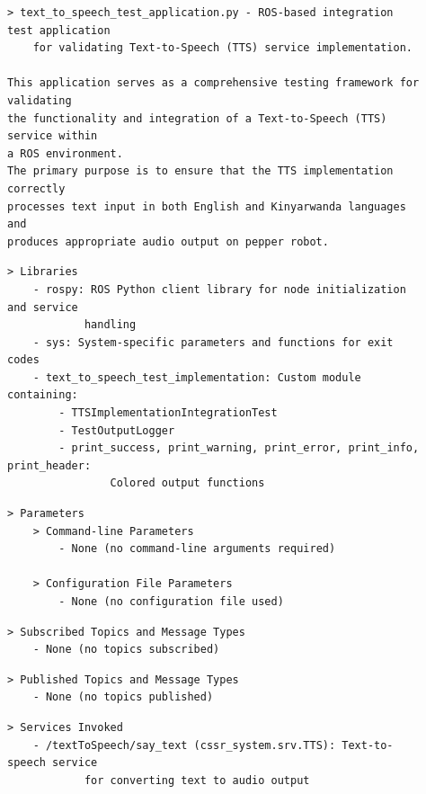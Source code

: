 \documentclass{CSSRforAfrica}
\newcommand{\checkboxChecked}{\fbox{\ding{51}}} %
\begin{document}
\begin{description}

\item[\checkboxChecked] 
{\small 
\begin{verbatim}
> text_to_speech_test_application.py - ROS-based integration test application
    for validating Text-to-Speech (TTS) service implementation.

This application serves as a comprehensive testing framework for validating
the functionality and integration of a Text-to-Speech (TTS) service within
a ROS environment.
The primary purpose is to ensure that the TTS implementation correctly
processes text input in both English and Kinyarwanda languages and
produces appropriate audio output on pepper robot.
\end{verbatim}}

\item[\checkboxChecked] 
{\small 
\begin{verbatim}
> Libraries
    - rospy: ROS Python client library for node initialization and service
            handling
    - sys: System-specific parameters and functions for exit codes
    - text_to_speech_test_implementation: Custom module containing:
        - TTSImplementationIntegrationTest
        - TestOutputLogger
        - print_success, print_warning, print_error, print_info, print_header:
                Colored output functions
\end{verbatim}}

\item[\checkboxChecked] 
{\small 
\begin{verbatim}
> Parameters
    > Command-line Parameters
        - None (no command-line arguments required)

    > Configuration File Parameters
        - None (no configuration file used)
\end{verbatim}}

\item[\checkboxChecked] 
{\small 
\begin{verbatim}
> Subscribed Topics and Message Types
    - None (no topics subscribed)
\end{verbatim}}

\item[\checkboxChecked] 
{\small 
\begin{verbatim}                    
> Published Topics and Message Types
    - None (no topics published)
\end{verbatim}}


\item[\checkboxChecked]
{\small
\begin{verbatim}
> Services Invoked
    - /textToSpeech/say_text (cssr_system.srv.TTS): Text-to-speech service
            for converting text to audio output
\end{verbatim}}



\end{description}
\end{document}
